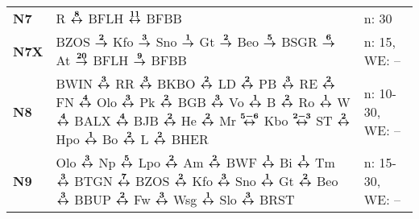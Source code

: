 \begin{minipage}[t]{0.45\textwidth}
\begin{tabular}{>{\bfseries}L{1.2cm}L{9.0cm}L{3.0cm}}
\nbus{} N7    & R $\xarwe{8}$ BFLH $\xarwe{11}$ BFBB
& n: 30                      \\
\nbus{} N7X   & BZOS $\xarre{2}$ Kfo $\xarre{3}$ Sno $\xarre{1}$ Gt $\xarre{2}$ Beo $\xarre{5}$ BSGR $\xarre{6}$ At $\xarre{20}$ BFLH
$\xarre{9}$ BFBB & n: 15, WE: -- \\
\nbus{} N8    & BWIN $\xarwe{3}$ RR $\xarwe{3}$ BKBO $\xarwe{2}$ LD $\xarwe{2}$ PB $\xarwe{3}$ RE $\xarwe{2}$ FN $\xarwe{4}$ Olo $\xarwe{3}$ Pk $\xarwe{2}$ BGB $\xarwe{3}$ Vo      %
                $\xarwe{1}$ B $\xarwe{2}$ Ro $\xarwe{1}$ W $\xarwe{4}$ BALX $\xarwe{4}$ BJB $\xarwe{2}$ He $\xarwe{2}$ Mr $\xarwe{5-6}$ Kbo $\xarwe{2-3}$ ST $\xarwe{2}$ Hpo        %
                $\xarwe{1}$ Bo $\xarwe{2}$ L $\xarwe{2}$ BHER                                                                                                                       & n: 10-30, WE: --           \\
\nbus{} N9    & Olo $\xarwe{3}$ Np $\xarwe{5}$ Lpo $\xarwe{2}$ Am $\xarwe{2}$ BWF $\xarwe{1}$ Bi $\xarwe{1}$ Tm $\xarwe{3}$ BTGN $\xarwe{7}$ BZOS $\xarwe{2}$ Kfo $\xarwe{3}$ Sno   %
                $\xarwe{1}$ Gt $\xarwe{2}$ Beo $\xarwe{3}$ BBUP $\xarwe{2}$ Fw $\xarwe{3}$ Wsg $\xarwe{1}$ Slo $\xarwe{3}$ BRST                                                     & n: 15-30, WE: --           \\ 
\hline
\end{tabular}
\end{minipage}
